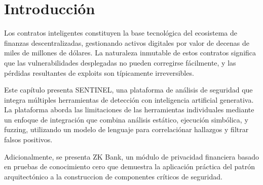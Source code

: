\documentclass[12pt,a4paper,twoside]{book}
\begin{document}
\vspace{0.5cm}


\vspace{1cm}

\section{Introducción}

Los contratos inteligentes constituyen la base tecnológica del ecosistema de finanzas descentralizadas, gestionando activos digitales por valor de decenas de miles de millones de dólares. La naturaleza inmutable de estos contratos significa que las vulnerabilidades desplegadas no pueden corregirse fácilmente, y las pérdidas resultantes de exploits son típicamente irreversibles.

Este capítulo presenta SENTINEL, una plataforma de análisis de seguridad que integra múltiples herramientas de detección con inteligencia artificial generativa. La plataforma aborda las limitaciones de las herramientas individuales mediante un enfoque de integración que combina análisis estático, ejecución simbólica, y fuzzing, utilizando un modelo de lenguaje para correlaciónar hallazgos y filtrar falsos positivos.

Adicionalmente, se presenta ZK Bank, un módulo de privacidad financiera basado en pruebas de conocimiento cero que demuestra la aplicación práctica del patrón arquitectónico a la construccion de componentes críticos de seguridad.
\end{document}
